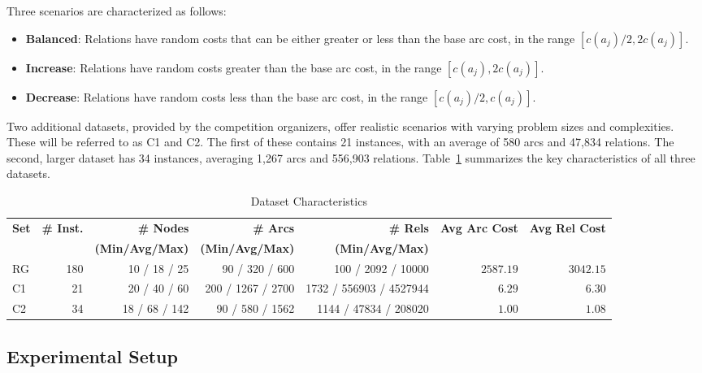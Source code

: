 \documentclass[twocolumn, switch]{article} %
\begin{document}
Three scenarios are characterized as follows:
\begin{itemize}
    \item \textbf{Balanced}: Relations have random costs that can be either greater or less than the base arc cost, in the range $[c(a_j)/2, 2c(a_j)]$.
    \item \textbf{Increase}: Relations have random costs greater than the base arc cost, in the range $[c(a_j), 2c(a_j)]$.
    \item \textbf{Decrease}: Relations have random costs less than the base arc cost, in the range $[c(a_j)/2, c(a_j)]$.
\end{itemize}

Two additional datasets, provided by the competition organizers, offer realistic scenarios with varying problem sizes and complexities. These will be referred to as C1 and C2. The first of these contains 21 instances, with an average of 580 arcs and 47,834 relations. The second, larger dataset has 34 instances, averaging 1,267 arcs and 556,903 relations. Table~\ref{tab:dataset_characteristics} summarizes the key characteristics of all three datasets.

\begin{table}[t]
    \setlength{\belowcaptionskip}{8pt}
    \caption{Dataset Characteristics}
    \label{tab:dataset_characteristics}
    \centering
    \begin{tabular}{lrrrrrr}
        \toprule
        \textbf{Set} & \textbf{\# Inst.} & \textbf{\# Nodes} & \textbf{\# Arcs} & \textbf{\# Rels} & \textbf{Avg Arc Cost} & \textbf{Avg Rel Cost} \\
        & & \textbf{(Min/Avg/Max)} & \textbf{(Min/Avg/Max)} & \textbf{(Min/Avg/Max)} & & \\
        \midrule
        RG & 180 & 10 / 18 / 25 & 90 / 320 / 600 & 100 / 2092 / 10000 & $2587.19$ & $3042.15$ \\
        C1 & 21 & 20 / 40 / 60 & 200 / 1267 / 2700 & 1732 / 556903 / 4527944 & $6.29$ & $6.30$ \\
        C2 & 34 & 18 / 68 / 142 & 90 / 580 / 1562 & 1144 / 47834 / 208020 & $1.00$ & $1.08$ \\
        \bottomrule
    \end{tabular}
\end{table}

\subsection{Experimental Setup}
\end{document}

